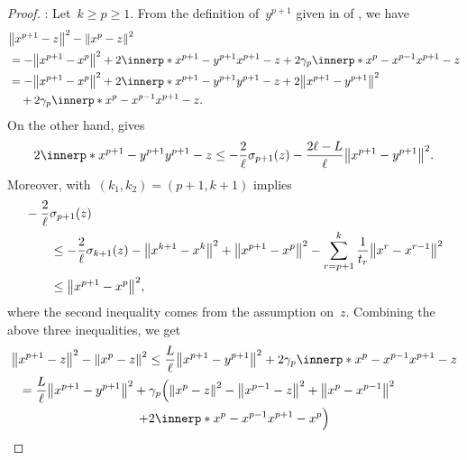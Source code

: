 \documentclass[../main]{subfiles}
\begin{document}
\begin{proof}
    :
    Let~$k \ge p \ge 1$.
    From the definition of~$y^{p + 1}$ given in  of , we have
    \begin{equation}
        \begin{split}
            &\norm*{x^{p + 1} - z}^2 - \norm*{x^p - z}^2 \\
        &= - \norm*{x^{p + 1} - x^p}^2 + 2 \innerp*{x^{p + 1} - y^{p + 1}}{x^{p + 1} - z} + 2 \gamma_p \innerp*{x^p - x^{p - 1}}{x^{p + 1} - z} \\
        &= - \norm*{x^{p + 1} - x^p}^2 + 2 \innerp*{x^{p + 1} - y^{p + 1}}{y^{p + 1} - z} + 2 \norm*{x^{p + 1} - y^{p + 1}}^2 \\
        &\quad + 2 \gamma_p \innerp*{x^p - x^{p - 1}}{x^{p + 1} - z}
     .   \end{split}
    \end{equation}
    On the other hand,  gives
    \begin{equation}
        2 \innerp*{x^{p + 1} - y^{p + 1}}{y^{p + 1} - z} \le - \frac{2}{\ell} \sigma_{p + 1}(z) - \frac{2 \ell - L}{\ell} \norm*{x^{p + 1} - y^{p + 1}}^2
    .\end{equation}
    Moreover,  with~$(k_1, k_2) = (p + 1, k + 1)$ implies
    \begin{equation}
        \begin{split}
            \MoveEqLeft
        - \frac{2}{\ell} \sigma_{p + 1}(z) \\
        &\le - \frac{2}{\ell} \sigma_{k + 1}(z) - \norm*{x^{k + 1} - x^k}^2 + \norm*{x^{p + 1} - x^p}^2 - \sum_{r = p + 1}^{k} \frac{1}{t_r}\norm*{x^r - x^{r - 1}}^2 \\
        &\le \norm*{x^{p + 1} - x^p}^2
        ,\end{split}
    \end{equation}
    where the second inequality comes from the assumption on~$z$.
    Combining the above three inequalities, we get
    \begin{multline}
        \norm*{x^{p + 1} - z}^2 - \norm*{x^p - z}^2 \le \frac{L}{\ell} \norm*{x^{p + 1} - y^{p + 1}}^2 + 2 \gamma_p \innerp*{x^p - x^{p - 1}}{x^{p + 1} - z} \\
        \shoveleft = \frac{L}{\ell} \norm*{x^{p + 1} - y^{p + 1}}^2
        + \gamma_p \Bigl( \norm*{x^p - z}^2 - \norm*{x^{p - 1} - z}^2 + \norm*{x^p - x^{p - 1}}^2 \\
    + 2 \innerp*{x^p - x^{p - 1}}{x^{p + 1} - x^p} \Bigr)

\end{multline}
\end{proof}
\end{document}
